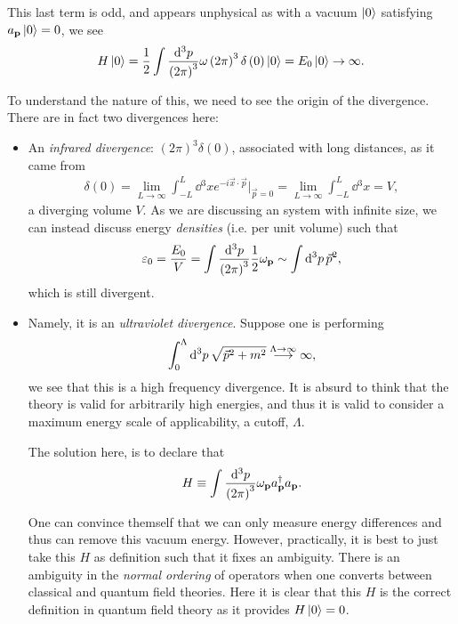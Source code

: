 This last term is odd, and appears unphysical as with a vacuum $\ket{0}$ satisfying $a_{\vb{p}} \ket{0} = 0$, we see
\begin{align}
    H \ket{0} = \frac{1}{2}\int \frac{\dd{^3p}}{\left( 2\pi \right)^3} \omega \left( 2\pi \right)^3 \delta \left( 0 \right) \ket{0} = E_0 \ket{0} \to \infty
.\end{align}

To understand the nature of this, we need to see the origin of the divergence. There are in fact two divergences here:
\begin{itemize}
    \item An \textit{infrared divergence}: $\left( 2\pi \right)^3 \delta \left( 0 \right) $, associated with long distances, as it came from
        \begin{align}
            \delta \left( 0 \right) = \lim_{L \to \infty} \int_{-L}^{L} \dd{^3x} e^{- i\vec{x}\cdot \vec{p}} \bigg|_{\vec{p}=0} = \lim_{L \to \infty} \int_{-L}^{L} \dd{^3x} = V
        ,\end{align}
        a diverging volume $V$. As we are discussing an system with infinite size, we can instead discuss energy \textit{densities} (i.e. per unit volume) such that
        \begin{align}
            \varepsilon_0 = \frac{E_0}{V} = \int \frac{\dd{^3p}}{\left( 2\pi \right)^3} \frac{1}{2}\omega_{\vb{p}} \sim  \int \dd{^3p} \vec{p}^2
        ,\end{align}
        which is still divergent. 
    \item Namely, it is an \textit{ultraviolet divergence}. Suppose one is performing
        \begin{align}
            \int_0^{\Lambda} \dd{^3p} \sqrt{\vec{p}^2 + m^2} \overset{\Lambda \to \infty}{\longrightarrow} \infty
        ,\end{align}
        we see that this is a high frequency divergence. It is absurd to think that the theory is valid for arbitrarily high energies, and thus it is valid to consider a maximum energy scale of applicability, a cutoff, $\Lambda$.

        The solution here, is to declare that
        \begin{align}
            H \equiv \int \frac{\dd{^3p}}{\left( 2\pi \right)^3} \omega_{\vb{p}} a_{\vb{p}}^{\dag} a_{\vb{p}}
        .\end{align}

        One can convince themself that we can only measure energy differences and thus can remove this vacuum energy. However, practically, it is best to just take this $H$ as definition such that it fixes an ambiguity. There is an ambiguity in the \textit{normal ordering} of operators when one converts between classical and quantum field theories. Here it is clear that this $H$ is the correct definition in quantum field theory as it provides $H \ket{0} = 0$.
\end{itemize}

